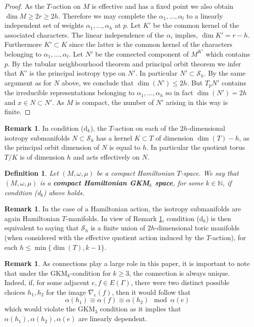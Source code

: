 \documentclass[12pt,a4paper]{amsart}
\newcommand{\NN}{\mathbb{N}}
\theoremstyle{plain}
\newtheorem{defn}[thm]{Definition}
\theoremstyle{definition}
\newtheorem{rem}[thm]{Remark}
\begin{document}
\begin{proof}
As the $T$-action on $M$ is effective and has a fixed point we also obtain $\dim M\geq
2r\geq 2h$. Therefore we may complete the $\alpha_1,\ldots,\alpha_l$
to a linearly independent set of weights $\alpha_1,\ldots,\alpha_h$ at $p$. Let $K'$ be
the common kernel of the associated characters. The linear independence of the $\alpha_i$
implies, $\dim K'=r-h$. Furthermore $K'\subset K$ since the latter is the common kernel of
the characters belonging to $\alpha_1,\ldots,\alpha_l$. Let $N'$ be the connected
component of $M^{K'}$ which contains $p$. By the tubular neighbourhood theorem and
principal orbit theorem we infer that $K'$ is the principal isotropy type on $N'$. In
particular $N'\subset \mathcal{S}_h$. By the same argument as for $N$ above, we conclude
that $\dim(N')\leq 2h$. But $T_p N'$ contains the irreducible representations belonging to
$\alpha_1,\ldots,\alpha_h$ so in fact $\dim(N')=2h$ and $x\in N\subset N'$. As $M$ is
compact, the number of $N'$ arising in this way is finite.


\end{proof}

\begin{rem}\label{rem: compl0}
In condition (d$_k$), the $T$-action on each of the $2h$-dimensional isotropy submanifolds $N\subset \mathcal{S}_h$ has a kernel $K\subset T$ of dimension $\dim (T)-h$, as the principal orbit dimension of $N$ is equal to $h$. In particular the quotient torus $T/K$ is of dimension $h$ and acts effectively on $N$.
\end{rem}

\begin{defn}\label{def Ham GKMk}
Let $(M,\omega,\mu)$ be a compact Hamiltonian $T$-space. We say that 
$(M,\omega,\mu)$ is a \textbf{compact Hamiltonian GKM$_k$ space}, for some
$k\in \NN$, if condition (d$_k$) above holds. 
\end{defn}

\begin{rem}\label{gkmk ham}
In the case of a Hamiltonian action, the isotropy submanifolds are again Hamiltonian $T$-manifolds. In view of Remark \ref{rem: compl0}, condition (d$_k$) is then equivalent to saying that $\mathcal{S}_h$ is a finite union of $2h$-dimensional toric manifolds (when considered with the effective quotient action induced by the $T$-action), for each $h\leq \min\{\dim(T),k-1\}$.
\end{rem}

\begin{rem}\label{rem: gkm3connection}
As connections play a large role in this paper, it is important to note that under the GKM$_k$-condition for $k\geq 3$, the connection is always unique. Indeed, if, for some adjacent $e,f\in E(\Gamma)$, there were two distinct possible choices $h_1,h_2$ for the image $\nabla_e(f)$, then it would follow that
\[\alpha(h_1) \equiv \alpha(f)\equiv \alpha(h_2)\mod \alpha(e)\]
which would violate the GKM$_3$ condition as it implies that $\alpha(h_1),\alpha(h_2),\alpha(e)$ are linearly dependent.
\end{rem}
\end{document}
